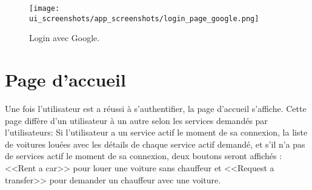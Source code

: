 \begin{center}
    \begin{figure}[H]
        \centering
        \texttt{[image: ui\_screenshots/app\_screenshots/login\_page\_google.png]}
        \vspace{1cm}
        \captionsetup{justification=centering}

        \caption{Login avec Google.}
        \label{fig:app_login_google}
    \end{figure}
\end{center}
\vspace{1cm}

\section{Page d'accueil}
Une fois l'utilisateur est a réussi à s'authentifier, la page d'accueil s'affiche. Cette page diffère d'un utilisateur à un autre selon les services demandés par l'utilisateurs: Si l'utilisateur a un service actif le moment de sa connexion, la liste de voitures louées avec les détails de chaque service actif demandé, et s'il n'a pas de services actif le moment de sa connexion, deux boutons seront affichés : <<Rent a car>> pour louer une voiture sans chauffeur et <<Request a transfer>> pour demander un chauffeur avec une voiture.
\vspace{1cm}

\vspace{1cm}
